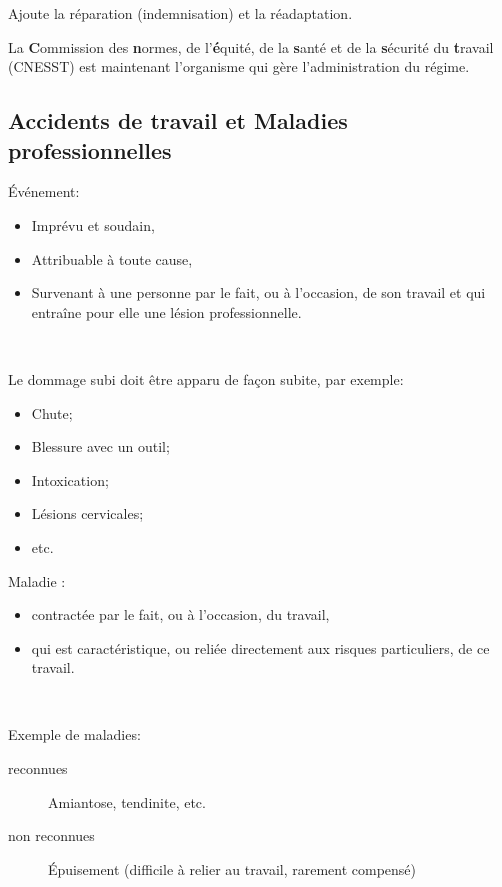 \documentclass[10pt, french]{article}
\begin{document}
\begin{multicols*}{3}
\begin{rappel_enhanced}
Ajoute la réparation (indemnisation) et la réadaptation.
\end{rappel_enhanced}

La \textbf{C}ommission des \textbf{n}ormes, de l'\textbf{é}quité, de la \textbf{s}anté et de la \textbf{s}écurité du \textbf{t}ravail (CNESST) est maintenant l'organisme qui gère l'administration du régime.


\columnbreak
\subsection{Accidents de travail et Maladies professionnelles}
\begin{definitionNOHFILL}
Événement: 
\begin{itemize}[leftmargin = *]
	\item	Imprévu et soudain, 
	\item	Attribuable à toute cause, 
	\item	Survenant à une personne par le fait, ou à l'occasion, de son travail et qui entraîne pour elle une lésion professionnelle.
\end{itemize}
\

Le dommage subi doit être apparu de façon subite, par exemple: 
\begin{itemize}[leftmargin = *]
	\item	Chute;
	\item	Blessure avec un outil;
	\item	Intoxication;
	\item	Lésions cervicales;
	\item    etc.
\end{itemize}
\end{definitionNOHFILL}

\begin{definitionNOHFILL}
Maladie :
\begin{itemize}[leftmargin = *]
	\item	contractée par le fait, ou à l'occasion, du travail,
	\item	qui est caractéristique, ou reliée directement aux risques particuliers, de ce travail.
\end{itemize}
\

Exemple de maladies:
\begin{description}
	\item[reconnues]	Amiantose, tendinite, etc.
	\item[non reconnues]	Épuisement (difficile à relier au travail, rarement compensé)
\end{description}
\end{definitionNOHFILL}


\end{multicols*}
\end{document}

